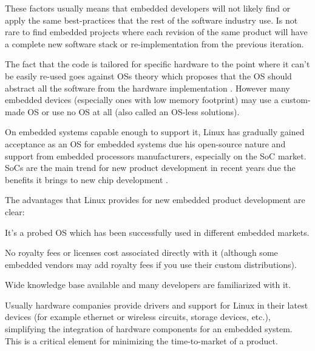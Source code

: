 These factors usually means that embedded developers will not likely find or apply the same best-practices that the rest of the software industry use. Is not rare to find embedded projects where each revision of the same product will have a complete new software stack or re-implementation from the previous iteration.

The fact that the code is tailored for specific hardware to the point where it can't be easily re-used goes against \acp{OS} theory which proposes that the \ac{OS} should abstract all the software from the hardware implementation \citep[p.~29]{Silberschatz:2010vn}. However many embedded devices (especially ones with low memory footprint) may use a custom-made \ac{OS} or use no \ac{OS} at all (also called an \ac{OS}-less solutions).

On embedded systems capable enough to support it, Linux has gradually gained acceptance as an \ac{OS} for embedded systems due his open-source nature and support from embedded processors manufacturers, especially on the \ac{SoC} market. \acp{SoC} are the main trend for new product development in recent years due the benefits it brings to new chip development \citep{Somaya:2000fk}.

The advantages that Linux provides for new embedded product development are clear:
\begin{itemize*}
\item It's a probed \ac{OS} which has been successfully used in different embedded markets.
\item No royalty fees or licenses cost associated directly with it (although some embedded vendors may add royalty fees if you use their custom distributions).
\item Wide knowledge base available and many developers are familiarized with it.
\item Usually hardware companies provide drivers and support for Linux in their latest devices (for example ethernet or wireless circuits, storage devices, etc.), simplifying the integration of hardware components for an embedded system. This is a critical element for minimizing the time-to-market of a product.
\end{itemize*}

